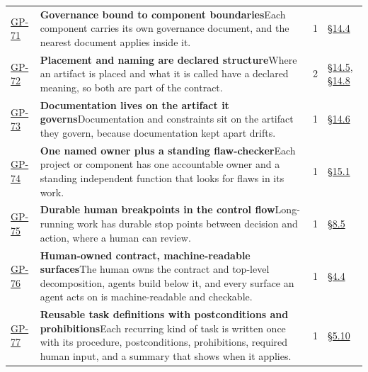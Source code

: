 \begin{longtable}{@{}p{} p{} r p{}@{}}
\hyperlink{gp-71}{GP-71}\hypertarget{gp-71}{} & \textbf{Governance bound to component boundaries}\newline Each component carries its own governance document, and the nearest document applies inside it.\rule[-\normalbaselineskip]{0pt}{0pt} & 1 & \hyperlink{nss-14.4}{\S14.4}\rule[-\normalbaselineskip]{0pt}{0pt} \\
\hyperlink{gp-72}{GP-72}\hypertarget{gp-72}{} & \textbf{Placement and naming are declared structure}\newline Where an artifact is placed and what it is called have a declared meaning, so both are part of the contract.\rule[-\normalbaselineskip]{0pt}{0pt} & 2 & \hyperlink{nss-14.5}{\S14.5}, \hyperlink{nss-14.8}{\S14.8}\rule[-\normalbaselineskip]{0pt}{0pt} \\
\hyperlink{gp-73}{GP-73}\hypertarget{gp-73}{} & \textbf{Documentation lives on the artifact it governs}\newline Documentation and constraints sit on the artifact they govern, because documentation kept apart drifts.\rule[-\normalbaselineskip]{0pt}{0pt} & 1 & \hyperlink{nss-14.6}{\S14.6}\rule[-\normalbaselineskip]{0pt}{0pt} \\
\hyperlink{gp-74}{GP-74}\hypertarget{gp-74}{} & \textbf{One named owner plus a standing flaw-checker}\newline Each project or component has one accountable owner and a standing independent function that looks for flaws in its work.\rule[-\normalbaselineskip]{0pt}{0pt} & 1 & \hyperlink{nss-15.1}{\S15.1}\rule[-\normalbaselineskip]{0pt}{0pt} \\
\hyperlink{gp-75}{GP-75}\hypertarget{gp-75}{} & \textbf{Durable human breakpoints in the control flow}\newline Long-running work has durable stop points between decision and action, where a human can review.\rule[-\normalbaselineskip]{0pt}{0pt} & 1 & \hyperlink{nss-8.5}{\S8.5}\rule[-\normalbaselineskip]{0pt}{0pt} \\
\hyperlink{gp-76}{GP-76}\hypertarget{gp-76}{} & \textbf{Human-owned contract, machine-readable surfaces}\newline The human owns the contract and top-level decomposition, agents build below it, and every surface an agent acts on is machine-readable and checkable.\rule[-\normalbaselineskip]{0pt}{0pt} & 1 & \hyperlink{nss-4.4}{\S4.4}\rule[-\normalbaselineskip]{0pt}{0pt} \\
\hyperlink{gp-77}{GP-77}\hypertarget{gp-77}{} & \textbf{Reusable task definitions with postconditions and prohibitions}\newline Each recurring kind of task is written once with its procedure, postconditions, prohibitions, required human input, and a summary that shows when it applies.\rule[-\normalbaselineskip]{0pt}{0pt} & 1 & \hyperlink{nss-5.10}{\S5.10}\rule[-\normalbaselineskip]{0pt}{0pt} \\

\end{longtable}
